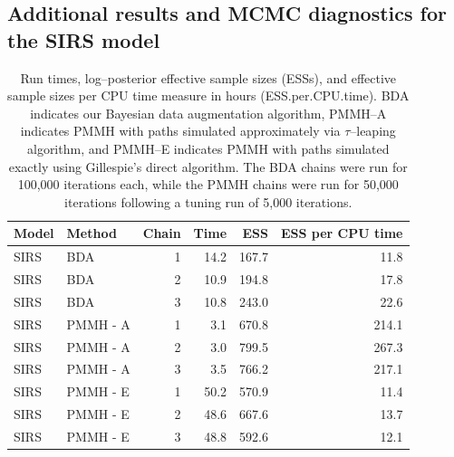 \subsection{Additional results and MCMC diagnostics for the SIRS model}

\begin{table}[htbp]
	\centering
	\begin{tabular}{llrrrr}
		\hline
		Model & Method & Chain & Time & ESS & ESS per CPU time \\ 
		\hline
		SIRS & BDA &  1 & 14.2 & 167.7 & 11.8 \\ 
		SIRS & BDA &  2 & 10.9 & 194.8 & 17.8 \\ 
		SIRS & BDA &  3 & 10.8 & 243.0 & 22.6 \\ 
		SIRS & PMMH - A &  1 & 3.1 & 670.8 & 214.1 \\ 
		SIRS & PMMH - A &  2 & 3.0 & 799.5 & 267.3 \\ 
		SIRS & PMMH - A &  3 & 3.5 & 766.2 & 217.1 \\ 
		SIRS & PMMH - E &  1 & 50.2 & 570.9 & 11.4 \\ 
		SIRS & PMMH - E &  2 & 48.6 & 667.6 & 13.7 \\ 
		SIRS & PMMH - E &  3 & 48.8 & 592.6 & 12.1 \\ 
		\hline
	\end{tabular}
	\caption[Simulation 1 SIRS model run times and log--posterior effective sample sizes.]{Run times, log--posterior effective sample sizes (ESSs), and effective sample sizes per CPU time measure in hours (ESS.per.CPU.time). BDA indicates our Bayesian data augmentation algorithm, PMMH--A indicates PMMH with paths simulated approximately via $ \tau $--leaping algorithm, and PMMH--E indicates PMMH with paths simulated exactly using Gillespie's direct algorithm. The BDA chains were run for 100,000 iterations each, while the PMMH chains were run for 50,000 iterations following a tuning run of 5,000 iterations.}
	\label{tab:sim1_sirs_ess}
\end{table}

